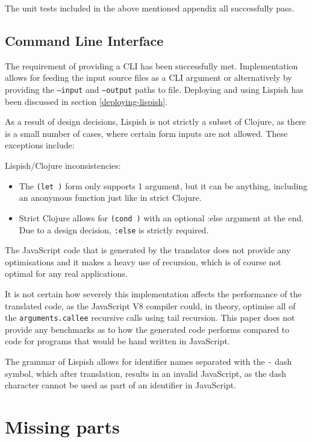 The unit tests included in the above mentioned appendix all successfully pass.

\subsection{Command Line Interface}
The requirement of providing a CLI has been successfully met. 
Implementation allows for feeding the input source files as a CLI argument or alternatively by providing the \texttt{--input} and \texttt{--output} paths to file. Deploying and using Lispish has been discussed in section \ref{deploying-lispish}.

As a result of design decisions, Lispish is not strictly a subset of Clojure, as there is a small number of cases, where certain form inputs are not allowed.
These exceptions include:

\noindent Lispish/Clojure inconsistencies:

\begin{itemize}
\item The \texttt{(let )} form only supports 1 argument, but it can be anything, including an anonymous function just like in strict Clojure.
\item Strict Clojure allows for \texttt{(cond )} with an optional :else argument at the end. Due to a design decision, \texttt{:else} is strictly required.
\end{itemize}


The JavaScript code that is generated by the translator does not provide any optimisations and it makes a heavy use of recursion, which is of course not optimal for any real applications. 

It is not certain how severely this implementation affects the performance of the translated code, as the JavaScript V8 compiler could, in theory, optimise all of the \texttt{arguments.callee} recursive calls using tail recursion. 
This paper does not provide any benchmarks as to how the generated code performs compared to code for programs that would be hand written in JavaScript. 

The grammar of Lispish allows for identifier names separated with the \texttt{-} dash symbol, which after translation, results in an invalid JavaScript, as the dash character cannot be used as part of an identifier in JavaScript.

\section{Missing parts}
